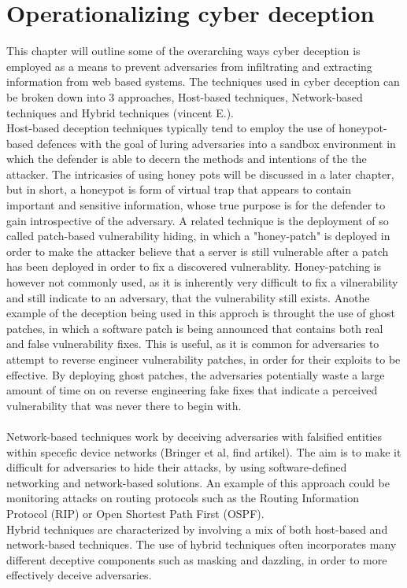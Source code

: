 \section{Operationalizing cyber deception}
This chapter will outline some of the overarching ways cyber deception is employed as a means to prevent adversaries from infiltrating and extracting information from web based systems. The techniques used in cyber deception can be broken down into 3 approaches, Host-based techniques, Network-based techniques and Hybrid techniques (vincent E.). \\
Host-based deception techniques typically tend to employ the use of honeypot-based defences with the goal of luring adversaries into a sandbox environment in which the defender is able to decern the methods and intentions of the the attacker. The intricasies of using honey pots will be discussed in a later chapter, but in short, a honeypot is form of virtual trap that appears to contain important and sensitive information, whose true purpose is for the defender to gain introspective of the adversary. A related technique is the deployment of so called patch-based vulnerability hiding, in which a "honey-patch" is deployed in order to make the attacker believe that a server is still vulnerable after a patch has been deployed in order to fix a discovered vulnerablity. Honey-patching is however not commonly used, as it is inherently very difficult to fix a vilnerability and still indicate to an adversary, that the vulnerability still exists. Anothe example of the deception being used in this approch is throught the use of ghost patches, in which a software patch is being announced that contains both real and false vulnerability fixes. This is useful, as it is common for adversaries to attempt to reverse engineer vulnerability patches, in order for their exploits to be effective. By deploying ghost patches, the adversaries potentially waste a large amount of time on on reverse engineering fake fixes that indicate a perceived vulnerability that was never there to begin with. 
\\\\
\noindent
Network-based techniques work by deceiving adversaries with falsified entities within specefic device networks (Bringer et al, find artikel).  The aim is to make it difficult for adversaries to hide their attacks, by using software-defined networking and network-based solutions. An example of this approach could be monitoring attacks on routing protocols such as the Routing Information Protocol (RIP) or Open Shortest Path First (OSPF). \\
Hybrid techniques are characterized by involving a mix of both host-based and network-based techniques. The use of hybrid techniques often incorporates many different deceptive components such as masking and dazzling, in order to more effectively deceive adversaries. \\\\
\noindent
